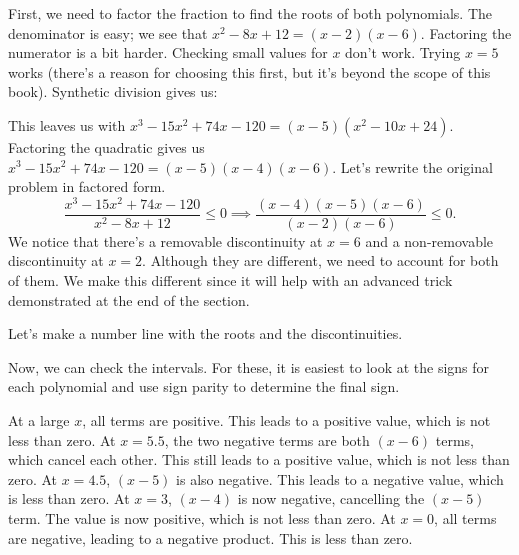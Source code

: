 \documentclass[lang=en,11pt]{elegantbook}
\begin{document}
\begin{solution}
First, we need to factor the fraction to find the roots of both polynomials. The denominator is easy; we see that $x^2-8x+12=(x-2)(x-6)$. Factoring the numerator is a bit harder.  Checking small values for $x$ don't work.  Trying $x=5$ works (there's a reason for choosing this first, but it's beyond the scope of this book).  Synthetic division gives us:


This leaves us with $x^3-15x^2+74x-120=(x-5)(x^2-10x+24)$.  Factoring the quadratic gives us $x^3-15x^2+74x-120=(x-5)(x-4)(x-6)$.  Let's rewrite the original problem in factored form.  $$\dfrac{x^3-15x^2+74x-120}{x^2-8x+12}\leq 0 \implies \dfrac{(x-4)(x-5)(x-6)}{(x-2)(x-6)}\leq 0.$$ We notice that there's a removable discontinuity at $x=6$ and a non-removable discontinuity at $x=2$.  Although they are different, we need to account for both of them. We make this different since it will help with an advanced trick demonstrated at the end of the section. 

Let's make a number line with the roots and the discontinuities.
\begin{figure}[!h]
    \centering
\end{figure}

Now, we can check the intervals. For these, it is easiest to look at the signs for each polynomial and use sign parity to determine the final sign.

At a large $x$, all terms are positive.  This leads to a positive value, which is not less than zero.  At $x=5.5$, the two negative terms are both $(x-6)$ terms, which cancel each other.  This still leads to a positive value, which is not less than zero.  At $x=4.5$, $(x-5)$ is also negative.  This leads to a negative value, which is less than zero.  At $x=3$, $(x-4)$ is now negative, cancelling the $(x-5)$ term.  The value is now positive, which is not less than zero.  At $x=0$, all terms are negative, leading to a negative product.  This is less than zero.


\end{solution}
\end{document}
